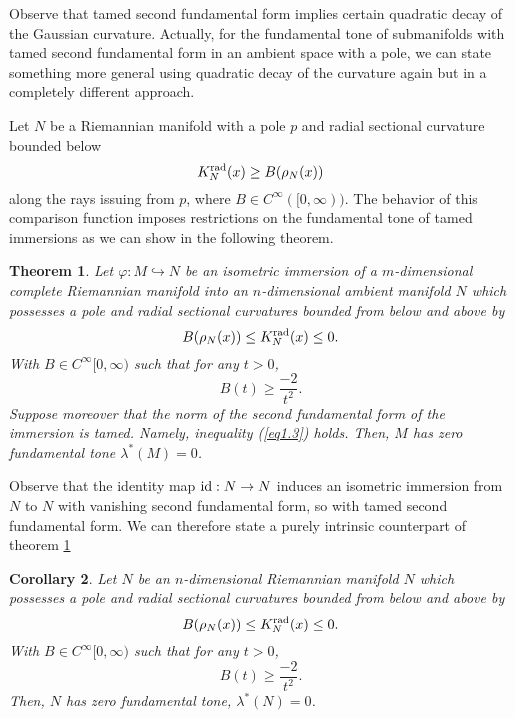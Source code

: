 \documentclass[a4paper]{amsart}
\newtheorem{theorem}{Theorem}[section]
\newtheorem{corollary}[theorem]{Corollary}
\theoremstyle{definition}
\numberwithin{equation}{section}
\begin{document}
Observe that tamed second fundamental form implies certain quadratic decay of the Gaussian curvature. Actually, for the fundamental tone of submanifolds with tamed second fundamental form in an ambient space with a pole, we can state something more general using quadratic decay of the curvature again but in a completely different approach.

Let $N$ be a Riemannian manifold with a pole $p$ and radial sectional curvature bounded below \[K^{\rm rad}_{N}(x)\geq  B(\rho_{N}(x))\]   along the rays issuing from $p$, where $B\in C^{\infty}([0,\infty))$. The behavior of this comparison function  imposes restrictions on  the fundamental tone of tamed immersions as we can show in the following theorem.

\begin{theorem}\label{tone-theo}Let $\varphi\colon M \hookrightarrow N$ be an isometric immersion of a $m$-dimensional complete Riemannian manifold into an $n$-dimensional ambient manifold $N$ which possesses a pole and radial sectional curvatures bounded from below and above by
\begin{equation}
 B(\rho_{N}(x))\leq K^{\rm rad}_{N}(x) \leq 0.
\end{equation}
With $B\in C^\infty[0,\infty)$ such that for any $t> 0$,
\begin{equation}
B(t)\geq \frac{-2}{t^2}.
\end{equation}
Suppose moreover that the norm of the second fundamental form of the immersion is tamed. Namely, inequality (\ref{eq1.3}) holds. Then, $M$ has zero fundamental tone $\lambda^*(M)=0$.\end{theorem}Observe that the identity map ${\rm id}:N\to N$ induces an isometric immersion from $N$ to $N$ with vanishing second fundamental form, so with tamed second fundamental form. We can therefore state a purely intrinsic counterpart of theorem \ref{tone-theo}
\begin{corollary}Let $N$ be an $n$-dimensional Riemannian manifold $N$ which possesses a pole and radial sectional curvatures bounded from below and above by
\begin{equation}
 B(\rho_{N}(x))\leq K^{\rm rad}_{N}(x) \leq 0.
\end{equation}
With $B\in C^\infty[0,\infty)$ such that for any $t> 0$,
\begin{equation}
B(t)\geq \frac{-2}{t^2}.
\end{equation}Then, $N$ has zero fundamental tone, $\lambda^*(N)=0$.\end{corollary}
\end{document}
